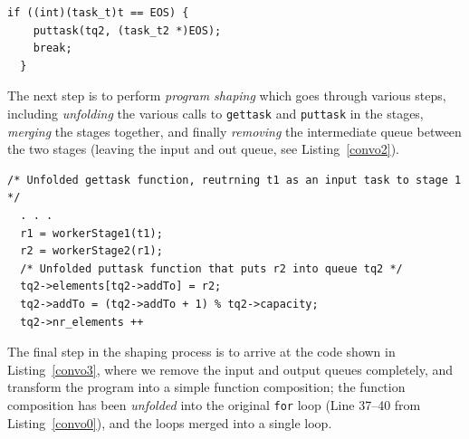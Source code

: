 \begin{lstlisting}[label=convo1, caption={Convolution, Repaired with a Termination Token},frame=single]
  if ((int)(task_t)t == EOS) {
    puttask(tq2, (task_t2 *)EOS);
    break;
  }
  \end{lstlisting}


\noindent
The next step is to perform \emph{program shaping} which goes through various steps, including \emph{unfolding} the various calls to \lstinline{gettask} and \lstinline{puttask} in the stages, \emph{merging} the stages together, and finally \emph{removing} the intermediate queue between the two stages (leaving the input and out queue, see Listing~\ref{convo2}). 

\begin{lstlisting}[label=convo2, caption={Stages merged, unfolded and intermediate queue removed},frame=single]
  /* Unfolded gettask function, reutrning t1 as an input task to stage 1 */
  . . .
  r1 = workerStage1(t1);
  r2 = workerStage2(r1);
  /* Unfolded puttask function that puts r2 into queue tq2 */
  tq2->elements[tq2->addTo] = r2;
  tq2->addTo = (tq2->addTo + 1) % tq2->capacity;
  tq2->nr_elements ++
\end{lstlisting}

\noindent
The final step in the shaping process is to arrive at the code shown in Listing~\ref{convo3}, where we remove the input and output queues completely, and transform the program into a simple function composition; the function composition has been \emph{unfolded} into the original \lstinline{for} loop (Line 37--40 from Listing~\ref{convo0}), and the loops merged into a single loop. 


